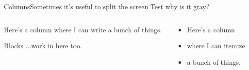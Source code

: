 
\begin{frame}[c]{Columns}{Sometimes it's useful to split the screen}
	Test why is it gray?
	
	\begin{columns}[t]
	\begin{column}[T]{5cm}
		Here's a column where I can write a bunch of things. \\
		
		\vspace{1em}
		\begin{block}{Blocks}
			...work in here too.
		\end{block}
	\end{column}
	\begin{column}[T]{5cm}
		\begin{itemize}
			\item Here's a column
			\item where I can itemize
			\item a bunch of things.
		\end{itemize}
	\end{column}
	\end{columns}
	
\end{frame}


